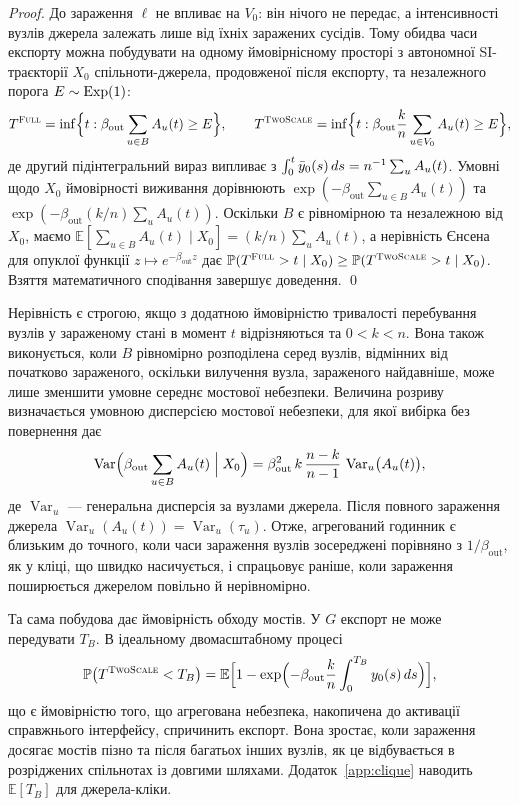 \begin{proof}
До зараження $\ell$ не впливає на $V_0$: він нічого не передає, а інтенсивності вузлів джерела залежать лише від їхніх заражених сусідів. Тому обидва часи експорту можна побудувати на одному ймовірнісному просторі з автономної SI-траєкторії $X_0$ спільноти-джерела, продовженої після експорту, та незалежного порога $E\sim\mathrm{Exp}(1)$:
\[
T^{\textup{\textsc{Full}}}=\inf\Bigl\{t:\beta_{\mathrm{out}}\sum_{u\in B}A_u(t)\ge E\Bigr\},\qquad
T^{\textup{\textsc{TwoScale}}}=\inf\Bigl\{t:\beta_{\mathrm{out}}\frac{k}{n}\sum_{u\in V_0}A_u(t)\ge E\Bigr\},
\]
де другий підінтегральний вираз випливає з $\int_0^t\bar{y}_0(s)\,ds=n^{-1}\sum_uA_u(t)$. Умовні щодо $X_0$ ймовірності виживання дорівнюють $\exp(-\beta_{\mathrm{out}}\sum_{u\in B}A_u(t))$ та $\exp(-\beta_{\mathrm{out}}(k/n)\sum_uA_u(t))$. Оскільки $B$ є рівномірною та незалежною від $X_0$, маємо $\mathbb{E}[\sum_{u\in B}A_u(t)\mid X_0]=(k/n)\sum_uA_u(t)$, а нерівність Єнсена для опуклої функції $z\mapsto e^{-\beta_{\mathrm{out}}z}$ дає $\mathbb{P}(T^{\textup{\textsc{Full}}}>t\mid X_0)\ge\mathbb{P}(T^{\textup{\textsc{TwoScale}}}>t\mid X_0)$. Взяття математичного сподівання завершує доведення. \qed
\end{proof}

Нерівність є строгою, якщо з додатною ймовірністю тривалості перебування вузлів у зараженому стані в момент $t$ відрізняються та $0<k<n$. Вона також виконується, коли $B$ рівномірно розподілена серед вузлів, відмінних від початково зараженого, оскільки вилучення вузла, зараженого найдавніше, може лише зменшити умовне середнє мостової небезпеки. Величина розриву визначається умовною дисперсією мостової небезпеки, для якої вибірка без повернення дає
\begin{equation}
\label{eq:hazard_variance}
\operatorname{Var}\Bigl(\beta_{\mathrm{out}}\sum_{u\in B}A_u(t)\Bigm| X_0\Bigr)=\beta_{\mathrm{out}}^2\,k\,\frac{n-k}{n-1}\,\operatorname{Var}_u\bigl(A_u(t)\bigr),
\end{equation}
де $\operatorname{Var}_u$ --- генеральна дисперсія за вузлами джерела. Після повного зараження джерела $\operatorname{Var}_u(A_u(t))=\operatorname{Var}_u(\tau_u)$. Отже, агрегований годинник є близьким до точного, коли часи зараження вузлів зосереджені порівняно з $1/\beta_{\mathrm{out}}$, як у кліці, що швидко насичується, і спрацьовує раніше, коли зараження поширюється джерелом повільно й нерівномірно.

Та сама побудова дає ймовірність обходу мостів. У $G$ експорт не може передувати $T_B$. В ідеальному двомасштабному процесі
\begin{equation}
\label{eq:bypass}
\mathbb{P}\bigl(T^{\textup{\textsc{TwoScale}}}<T_B\bigr)=\mathbb{E}\Bigl[1-\exp\Bigl(-\beta_{\mathrm{out}}\frac{k}{n}\int_0^{T_B}y_0(s)\,ds\Bigr)\Bigr],
\end{equation}
що є ймовірністю того, що агрегована небезпека, накопичена до активації справжнього інтерфейсу, спричинить експорт. Вона зростає, коли зараження досягає мостів пізно та після багатьох інших вузлів, як це відбувається в розріджених спільнотах із довгими шляхами. Додаток~\ref{app:clique} наводить $\mathbb{E}[T_B]$ для джерела-кліки.

